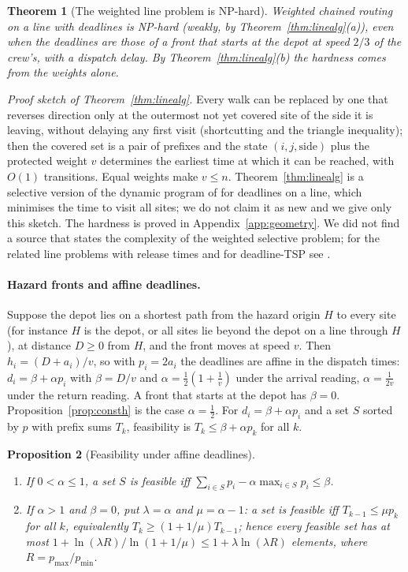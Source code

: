 \documentclass[pdflatex,sn-mathphys-ay]{sn-jnl}
\theoremstyle{thmstyleone}
\newtheorem{theorem}{Theorem}
\newtheorem{proposition}[theorem]{Proposition}
\theoremstyle{thmstyletwo}
\theoremstyle{thmstylethree}
\begin{document}
\begin{theorem}[The weighted line problem is NP-hard]\label{thm:linehard}
Weighted chained routing on a line with deadlines is NP-hard (weakly, by
Theorem~\ref{thm:linealg}(a)), even when the deadlines are those of a front
that starts at the depot at speed $2/3$ of the crew's, with a dispatch
delay. By Theorem~\ref{thm:linealg}(b) the hardness comes from the
weights alone.
\end{theorem}

\emph{Proof sketch of Theorem~\ref{thm:linealg}.} Every walk can be replaced
by one that reverses direction only at the outermost not yet covered site
of the side it is leaving, without delaying any first visit (shortcutting
and the triangle inequality); then the covered set is a pair of prefixes
and the state $(i,j,\text{side})$ plus the protected weight $v$ determines
the earliest time at which it can be reached, with $O(1)$ transitions.
Equal weights make $v\le n$. Theorem~\ref{thm:linealg} is a selective
version of the dynamic program of \citet{tsitsiklis1992} for deadlines on a
line, which minimises the time to visit all sites; we do not claim it as
new and we give only this sketch. The hardness is proved in
Appendix~\ref{app:geometry}. We did not find a source that states the
complexity of the weighted selective problem; for the related line
problems with release times and for deadline-TSP see
\citet{psaraftis1990,afrati1986,baryehuda2005,farbstein2019}.

\paragraph{Hazard fronts and affine deadlines.} Suppose the depot lies on
a shortest path from the hazard origin $H$ to every site (for instance
$H$ is the depot, or all sites lie beyond the depot on a line through
$H$), at distance $D\ge0$ from $H$, and the front moves at speed $v$. Then
$h_i=(D+a_i)/v$, so with $p_i=2a_i$ the deadlines are affine in the
dispatch times: $d_i=\beta+\alpha p_i$ with $\beta=D/v$ and
$\alpha=\tfrac12(1+\tfrac1v)$ under the arrival reading, $\alpha=\tfrac1{2v}$ under
the return reading. A front that starts at the depot has $\beta=0$.
Proposition~\ref{prop:consth} is the case $\alpha=\tfrac12$. For
$d_i=\beta+\alpha p_i$ and a set $S$ sorted by $p$ with prefix sums $T_k$,
feasibility is $T_k\le\beta+\alpha p_k$ for all $k$.

\begin{proposition}[Feasibility under affine deadlines]\label{prop:affine}
\begin{enumerate}
\item[(a)] If $0<\alpha\le1$, a set $S$ is feasible iff
$\sum_{i\in S}p_i-\alpha\max_{i\in S}p_i\le\beta$.
\item[(b)] If $\alpha>1$ and $\beta=0$, put $\lambda=\alpha$ and $\mu=\alpha-1$:
a set is feasible iff $T_{k-1}\le\mu p_k$ for all $k$, equivalently $T_k\ge(1+1/\mu)T_{k-1}$; hence every feasible set has
at most $1+\ln(\lambda R)/\ln(1+1/\mu)\le1+\lambda\ln(\lambda R)$ elements, where $R=p_{\max}/p_{\min}$.
\end{enumerate}
\end{proposition}
\end{document}
